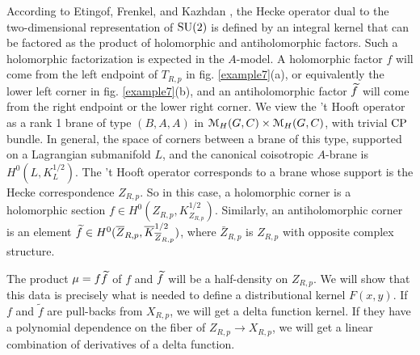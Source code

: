 \documentclass[11pt,a4paper]{article}
\begin{document}
According to Etingof, Frenkel, and Kazhdan \cite{EFK2},  the Hecke operator dual to the two-dimensional representation of ${\mathrm{SU}}(2)$ is defined by an integral
kernel that can be factored as the product of holomorphic and antiholomorphic factors.   Such a holomorphic factorization
is expected in the $A$-model.   A holomorphic factor $f$ will come from  
 the left endpoint of  $T_{R,p}$ in fig. \ref{example7}(a), or equivalently the lower left corner in fig. 
\ref{example7}(b),  and an antiholomorphic factor $\widetilde f$ will come from the right endpoint or the lower right corner.
We view the 't Hooft operator as a rank 1 brane of type $(B,A,A)$ in ${\mathcal M}_H(G,C)\times {\mathcal M}_H(G,C)$, with trivial ${\mathrm{CP}}$ bundle.    In general, the space of corners between a brane of this type, supported on a Lagrangian submanifold $L$, and the canonical coisotropic $A$-brane is $H^0(L,K_L^{1/2})$.   The 't Hooft operator corresponds to a brane whose support
 is the Hecke correspondence $Z_{R,p}$.  So in this case, a holomorphic corner is a holomorphic section $f\in H^0(Z_{R,p},K^{1/2}_{Z_{R,p}})$.
  Similarly, an antiholomorphic corner is an element $\widetilde f\in H^0(\overline Z_{R,p},\overline K^{1/2}_{\overline Z_{R,p}})$, where
  $\bar Z_{R,p}$ is $Z_{R,p}$ with opposite complex structure.
 
 
  
The product $\mu = f \widetilde f$ of $f$ and $\widetilde f$ will be a half-density on $Z_{R,p}$. We will  show that this data is precisely what is needed to define a 
distributional kernel $F(x,y)$. If $f$ and $\tilde f$ are pull-backs from $X_{R,p}$, we will get a delta function kernel. If they have a polynomial dependence on the fiber of $Z_{R,p} \to X_{R,p}$, we will get a linear combination of derivatives of a delta function. 
\end{document}
